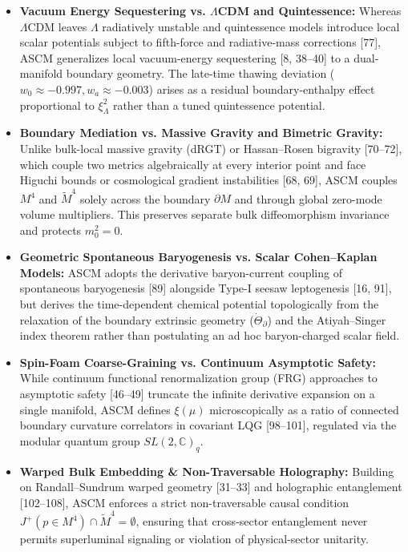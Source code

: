 \documentclass[aps,prd,onecolumn,superscriptaddress,nofootinbib,longbibliography,10pt]{revtex4-2}
\begin{document}
  
\begin{itemize}
    
\item \textbf{Vacuum Energy Sequestering vs. $\Lambda$CDM and Quintessence:} Whereas $\Lambda$CDM leaves \(\Lambda\) radiatively unstable and quintessence models introduce local scalar potentials subject to fifth-force and radiative-mass corrections [77], ASCM generalizes local vacuum-energy sequestering [8, 38–40] to a dual-manifold boundary geometry. The late-time thawing deviation (\(w_0 \approx -0.997, w_a \approx -0.003\)) arises as a residual boundary-enthalpy effect proportional to \(\xi_\Lambda^2\) rather than a tuned quintessence potential.
    
\item \textbf{Boundary Mediation vs. Massive Gravity and Bimetric Gravity:} Unlike bulk-local massive gravity (dRGT) or Hassan–Rosen bigravity [70–72], which couple two metrics algebraically at every interior point and face Higuchi bounds or cosmological gradient instabilities [68, 69], ASCM couples \(M^4\) and \(\tilde{M}^4\) solely across the boundary \(\partial M\) and through global zero-mode volume multipliers. This preserves separate bulk diffeomorphism invariance and protects \(m_0^2 = 0\).
    
\item \textbf{Geometric Spontaneous Baryogenesis vs. Scalar Cohen–Kaplan Models:} ASCM adopts the derivative baryon-current coupling of spontaneous baryogenesis [89] alongside Type-I seesaw leptogenesis [16, 91], but derives the time-dependent chemical potential topologically from the relaxation of the boundary extrinsic geometry (\(\dot{\Theta}_\partial\)) and the Atiyah–Singer index theorem rather than postulating an ad hoc baryon-charged scalar field.
    
\item \textbf{Spin-Foam Coarse-Graining vs. Continuum Asymptotic Safety:} While continuum functional renormalization group (FRG) approaches to asymptotic safety [46–49] truncate the infinite derivative expansion on a single manifold, ASCM defines \(\xi(\mu)\) microscopically as a ratio of connected boundary curvature correlators in covariant LQG [98–101], regulated via the modular quantum group \(SL(2,\mathbb{C})_q\).
    
\item \textbf{Warped Bulk Embedding \& Non-Traversable Holography:} Building on Randall–Sundrum warped geometry [31–33] and holographic entanglement [102–108], ASCM enforces a strict non-traversable causal condition \(J^+(p \in M^4) \cap \tilde{M}^4 = \emptyset\), ensuring that cross-sector entanglement never permits superluminal signaling or violation of physical-sector unitarity.
  
\end{itemize}
\end{document}
